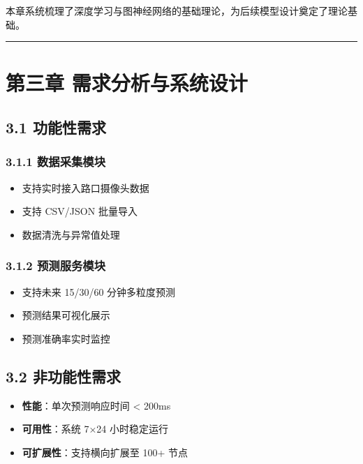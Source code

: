 \documentclass{harryopo-mathnotes}
\begin{document}
本章系统梳理了深度学习与图神经网络的基础理论，为后续模型设计奠定了理论基础。

\begin{center}\rule{0.5\linewidth}{0.5pt}\end{center}

\section{第三章
需求分析与系统设计}\label{ux7b2cux4e09ux7ae0-ux9700ux6c42ux5206ux6790ux4e0eux7cfbux7edfux8bbeux8ba1}

\subsection{3.1 功能性需求}\label{ux529fux80fdux6027ux9700ux6c42}

\subsubsection{3.1.1
数据采集模块}\label{ux6570ux636eux91c7ux96c6ux6a21ux5757}

\begin{itemize}
\tightlist
\item
  支持实时接入路口摄像头数据
\item
  支持 CSV/JSON 批量导入
\item
  数据清洗与异常值处理
\end{itemize}

\subsubsection{3.1.2
预测服务模块}\label{ux9884ux6d4bux670dux52a1ux6a21ux5757}

\begin{itemize}
\tightlist
\item
  支持未来 15/30/60 分钟多粒度预测
\item
  预测结果可视化展示
\item
  预测准确率实时监控
\end{itemize}

\subsection{3.2
非功能性需求}\label{ux975eux529fux80fdux6027ux9700ux6c42}

\begin{itemize}
\tightlist
\item
  \textbf{性能}：单次预测响应时间 \textless{} 200ms
\item
  \textbf{可用性}：系统 7×24 小时稳定运行
\item
  \textbf{可扩展性}：支持横向扩展至 100+ 节点
\end{itemize}
\end{document}
